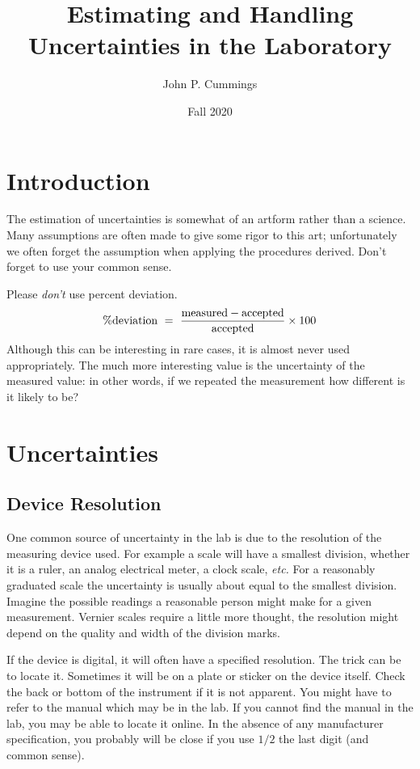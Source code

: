 \documentclass{article}
\title{Estimating and Handling Uncertainties in the Laboratory}
\author{John P. Cummings}
\date{Fall 2020}
\begin{document}
\maketitle

\section{Introduction}
The estimation of uncertainties is somewhat of an artform rather than a science.  Many assumptions are often made to give some rigor to this art; unfortunately we often forget the assumption when applying the procedures derived.  Don't forget to use your common sense.

Please {\em don't} use percent deviation.  
\begin{equation}
\% {\rm deviation} ~=~ {{ \rm measured} - {\rm accepted } \over {\rm accepted }} \times 100
\end{equation}
Although this can be interesting in rare cases, it is almost never used appropriately.  The much more interesting value is the uncertainty of the measured value: in other words, if we repeated the measurement how different is it likely to be? 

\section{Uncertainties}

\subsection{Device Resolution}
One common source of uncertainty in the lab is due to the resolution of the measuring device used.  For example a scale will have a smallest division, whether it is a ruler, an analog electrical meter, a clock scale, {\em etc.}  For a reasonably graduated scale the uncertainty is usually about equal to the smallest division.  Imagine the possible readings a reasonable person might make for a given measurement.  Vernier scales require a little more thought, the resolution might depend on the quality and width of the division marks.

If the device is digital, it will often have a specified resolution.  The trick can be to locate it.  Sometimes it will be on a plate or sticker on the device itself.  Check the back or bottom of the instrument if it is not apparent.  You might have to refer to the manual which may be in the lab.  If you cannot find the manual in the lab, you may be able to locate it online.  In the absence of any manufacturer specification, you probably will be close if you use $1/2$ the last digit (and common sense).
\end{document}
